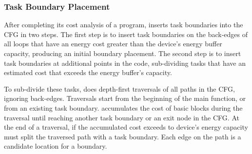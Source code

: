 

\subsubsection{Task Boundary Placement}
\label{sec:compiler_boundary}

After completing its cost analysis of a program, \sys inserts task boundaries
into the CFG in two steps.  The first step is to insert task boundaries on the
back-edges of all loops that have an energy cost greater than the device's
energy buffer capacity, producing an initial boundary placement. The second
step is to insert task boundaries at additional points in the code,
sub-dividing tasks that have an estimated cost that exceeds the energy buffer's
capacity.

To sub-divide these tasks, \sys does depth-first traversals of all paths in the
CFG, ignoring back-edges. Traversals start from the beginning of the main
function, or from an existing task boundary.  \sys accumulates the cost of
basic blocks during the traversal until reaching another task boundary or an
exit node in the CFG.   At the end of a traversal, if the accumulated cost
exceeds to device's energy capacity \sys must split the traversed path with a
task boundary.  Each edge on the path is a candidate location for a boundary.

